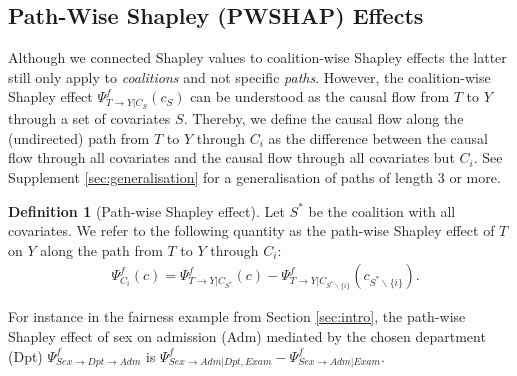\documentclass{article}
\theoremstyle{plain}
\theoremstyle{definition}
\newtheorem{definition}[theorem]{Definition}
\theoremstyle{remark}
\newcommand{\effect}{\Psi}
\theoremstyle{mystyle}
\begin{document}

\subsection{Path-Wise Shapley (PWSHAP) Effects}
 Although we connected Shapley values to coalition-wise Shapley effects the latter still only apply to \textit{coalitions} and not specific \textit{paths}. However, the coalition-wise Shapley effect $\effect^f_{ T \rightarrow Y | C_{S}}(c_S)$ can be understood as the causal flow from $T$ to $Y$ through a set of covariates $S$. Thereby, we define the causal flow along the (undirected) path from $T$ to $Y$ through $C_i$ as the difference between the causal flow through all covariates and the causal flow through all covariates but $C_i$. See Supplement \ref{sec:generalisation} for a generalisation of paths of length 3 or more. %
\begin{definition}[Path-wise Shapley effect] \label{def:path_shapley_values}
Let $S^*$ be the coalition with all covariates. We refer to the following quantity as the path-wise Shapley effect of $T$ on $Y$ along the path from $T$ to $Y$ through $C_i$:
\begin{align*}
        &\effect^f_{C_i}(c) = \effect^f_{ T \rightarrow Y | C_{S^*}}(c) - \effect^f_{ T \rightarrow Y | C_{S^*\backslash \{i\} }}(c_{S^*\backslash \{i\}}) .
\end{align*}
\end{definition}
For instance in the fairness example from Section \ref{sec:intro}, the path-wise Shapley effect of sex on admission (Adm) mediated by the chosen department (Dpt) $\effect^f_{Sex \rightarrow Dpt \rightarrow Adm}$ is 
 $\effect^f_{Sex \rightarrow Adm| {Dpt, Exam}}  - \effect^f_{Sex \rightarrow Adm| {Exam}}$.
 
\end{document}

